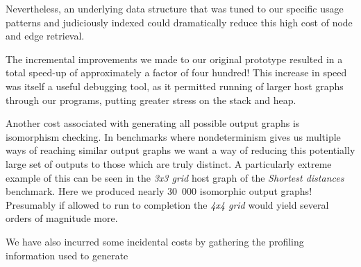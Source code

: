 Nevertheless, an underlying data structure that was tuned to our specific usage patterns and judiciously indexed could dramatically reduce this high cost of node and edge retrieval.

The incremental improvements we made to our original prototype resulted in a total speed-up of approximately a factor of four hundred! This increase in speed was itself a useful debugging tool, as it permitted running of larger host graphs through our programs, putting greater stress on the stack and heap.


Another cost associated with generating all possible output graphs is isomorphism checking. In benchmarks where nondeterminism gives us multiple ways of reaching similar output graphs we want a way of reducing this potentially large set of outputs to those which are truly distinct. A particularly extreme example of this can be seen in the \textit{3x3 grid} host graph of the \textit{Shortest distances} benchmark. Here we produced nearly 30~000 isomorphic output graphs! Presumably if allowed to run to completion the \textit{4x4 grid} would yield several orders of magnitude more.



We have also incurred some incidental costs by gathering the profiling information used to generate 



